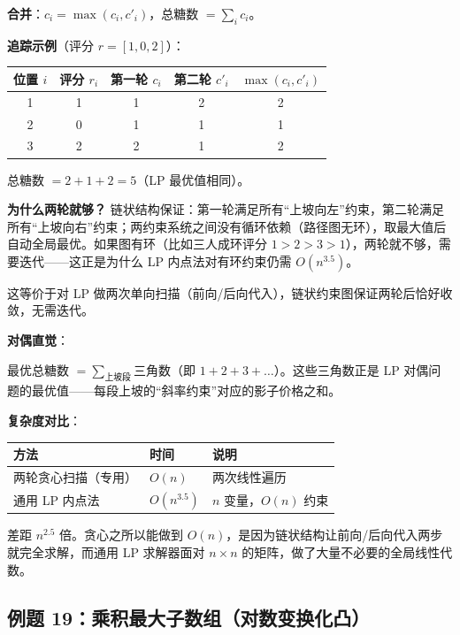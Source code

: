 \documentclass[12pt, a4paper]{ctexart}
\begin{document}
\begin{blackboard}
\textbf{合并}：$c_i = \max(c_i, c'_i)$，总糖数 $= \sum_i c_i$。

\textbf{追踪示例}（评分 $r = [1, 0, 2]$）：

\begin{center}
\begin{tabular}{ccccc}
\toprule
位置 $i$ & 评分 $r_i$ & 第一轮 $c_i$ & 第二轮 $c'_i$ & $\max(c_i,c'_i)$ \\
\midrule
1 & 1 & 1 & 2 & 2 \\
2 & 0 & 1 & 1 & 1 \\
3 & 2 & 2 & 1 & 2 \\
\bottomrule
\end{tabular}
\end{center}

总糖数 $= 2+1+2 = 5$（LP 最优值相同）。

\textbf{为什么两轮就够？} 链状结构保证：第一轮满足所有``上坡向左''约束，第二轮满足所有``上坡向右''约束；两约束系统之间没有循环依赖（路径图无环），取最大值后自动全局最优。如果图有环（比如三人成环评分 $1>2>3>1$），两轮就不够，需要迭代——这正是为什么 LP 内点法对有环约束仍需 $O(n^{3.5})$。

这等价于对 LP 做两次单向扫描（前向/后向代入），链状约束图保证两轮后恰好收敛，无需迭代。

\textbf{对偶直觉}：

最优总糖数 $= \sum_{\text{上坡段}} \text{三角数}$（即 $1+2+3+\ldots$）。这些三角数正是 LP 对偶问题的最优值——每段上坡的``斜率约束''对应的影子价格之和。

\textbf{复杂度对比}：

\begin{center}
\begin{tabular}{lll}
\toprule
方法 & 时间 & 说明 \\
\midrule
两轮贪心扫描（专用） & $O(n)$ & 两次线性遍历 \\
通用 LP 内点法 & $O(n^{3.5})$ & $n$ 变量，$O(n)$ 约束 \\
\bottomrule
\end{tabular}
\end{center}

差距 $n^{2.5}$ 倍。贪心之所以能做到 $O(n)$，是因为链状结构让前向/后向代入两步就完全求解，而通用 LP 求解器面对 $n \times n$ 的矩阵，做了大量不必要的全局线性代数。

\end{blackboard}

\subsection{例题 19：乘积最大子数组（对数变换化凸）}
\end{document}
